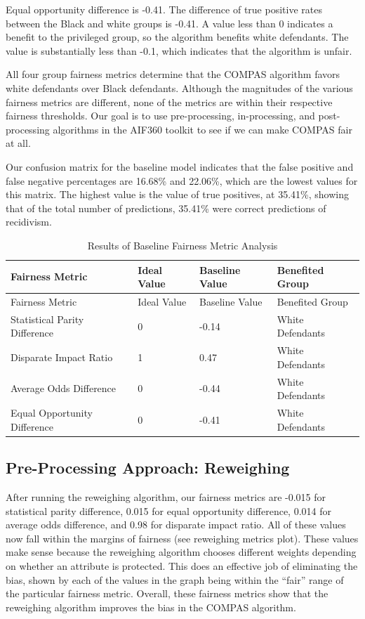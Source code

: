 \documentclass[water,article,submit,moreauthors,pdftex]{mdpi}
\begin{document}
Equal opportunity difference is -0.41. The difference of true positive
rates between the Black and white groups is -0.41. A value less than 0
indicates a benefit to the privileged group, so the algorithm benefits
white defendants. The value is substantially less than -0.1, which
indicates that the algorithm is unfair.

All four group fairness metrics determine that the COMPAS algorithm
favors white defendants over Black defendants. Although the magnitudes
of the various fairness metrics are different, none of the metrics are
within their respective fairness thresholds. Our goal is to use
pre-processing, in-processing, and post-processing algorithms in the
AIF360 toolkit to see if we can make COMPAS fair at all.

Our confusion matrix for the baseline model indicates that the false
positive and false negative percentages are 16.68\% and 22.06\%, which
are the lowest values for this matrix. The highest value is the value of
true positives, at 35.41\%, showing that of the total number of
predictions, 35.41\% were correct predictions of recidivism.

\begin{longtable}[]{@{}llll@{}}
\caption{Results of Baseline Fairness Metric Analysis
\label{tab:baseline metrics table}}\tabularnewline
\toprule
Fairness Metric & Ideal Value & Baseline Value & Benefited Group \\
\midrule
\endfirsthead
\toprule
Fairness Metric & Ideal Value & Baseline Value & Benefited Group \\
\midrule
\endhead
Statistical Parity Difference & 0 & -0.14 & White Defendants \\
Disparate Impact Ratio & 1 & 0.47 & White Defendants \\
Average Odds Difference & 0 & -0.44 & White Defendants \\
Equal Opportunity Difference & 0 & -0.41 & White Defendants \\
\bottomrule
\end{longtable}

\hypertarget{pre-processing-approach-reweighing}{%
\subsection{Pre-Processing Approach:
Reweighing}\label{pre-processing-approach-reweighing}}

After running the reweighing algorithm, our fairness metrics are -0.015
for statistical parity difference, 0.015 for equal opportunity
difference, 0.014 for average odds difference, and 0.98 for disparate
impact ratio. All of these values now fall within the margins of
fairness (see reweighing metrics plot). These values make sense because
the reweighing algorithm chooses different weights depending on whether
an attribute is protected. This does an effective job of eliminating the
bias, shown by each of the values in the graph being within the ``fair''
range of the particular fairness metric. Overall, these fairness metrics
show that the reweighing algorithm improves the bias in the COMPAS
algorithm.
\end{document}
